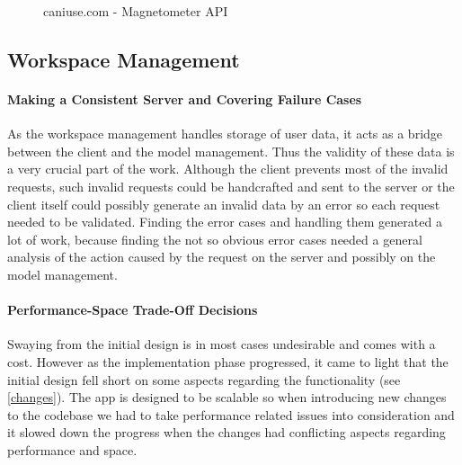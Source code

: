\begin{figure}[ht]
    \centering
    \caption{caniuse.com - Magnetometer API}
\end{figure}
\newpage
\subsection{Workspace Management}
\paragraph{Making a Consistent Server and Covering Failure Cases}
As the workspace management handles storage of user data, it acts as a bridge between the client and the model management. Thus the validity of these data is a very crucial part of the work. Although the client prevents most of the invalid requests, such invalid requests could be handcrafted and sent to the server or the client itself could possibly generate an invalid data by an error so each request needed to be validated. Finding the error cases and handling them generated a lot of work, because finding the not so obvious error cases needed a general analysis of the action caused by the request on the server and possibly on the model management.
\paragraph{Performance-Space Trade-Off Decisions}
Swaying from the initial design is in most cases undesirable and comes with a cost. However as the implementation phase progressed, it came to light that the initial design fell short on some aspects regarding the functionality (see \ref{changes}). The app is designed to be scalable so when introducing new changes to the codebase we had to take performance related issues into consideration and it slowed down the progress when the changes had conflicting aspects regarding performance and space.
